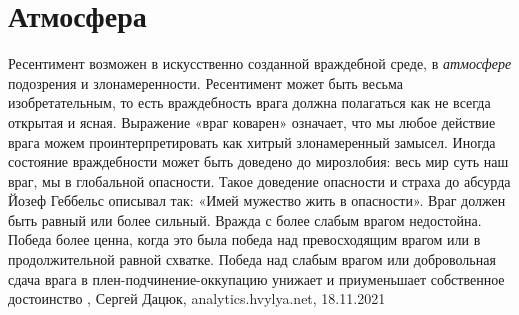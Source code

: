  
 
 
 
 
\chapter{Атмосфера}

Ресентимент возможен в искусственно созданной враждебной среде, в
\emph{атмосфере} подозрения и злонамеренности. Ресентимент может быть весьма
изобретательным, то есть враждебность врага должна полагаться как не всегда
открытая и ясная.  Выражение «враг коварен» означает, что мы любое действие
врага можем проинтерпретировать как хитрый злонамеренный замысел.  Иногда
состояние враждебности может быть доведено до мирозлобия: весь мир суть наш
враг, мы в глобальной опасности. Такое доведение опасности и страха до абсурда
Йозеф Геббельс описывал так: «Имей мужество жить в опасности».  Враг должен
быть равный или более сильный. Вражда с более слабым врагом недостойна. Победа
более ценна, когда это была победа над превосходящим врагом или в
продолжительной равной схватке. Победа над слабым врагом или добровольная сдача
врага в плен-подчинение-оккупацию унижает и приуменьшает собственное
достоинство
, Сергей Дацюк, analytics.hvylya.net, 18.11.2021
